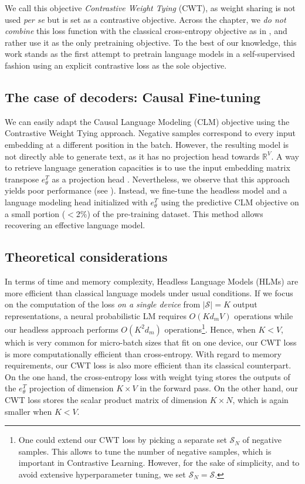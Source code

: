We call this objective \textit{Contrastive Weight Tying} (CWT), as weight sharing is not used \textit{per se} but is set as a contrastive objective. Across the chapter, we \textit{do not combine} this loss function with the classical cross-entropy objective as in \citet{su2022contrastive}, and rather use it as the only pretraining objective. To the best of our knowledge, this work stands as the first attempt to pretrain language models in a self-supervised fashion using an explicit contrastive loss as the sole objective.

\subsection{The case of decoders: Causal Fine-tuning}
\label{sec:causal_fine-tuning}

We can easily adapt the Causal Language Modeling (CLM) objective using the Contrastive Weight Tying approach. Negative samples correspond to every input embedding at a different position in the batch. However, the resulting model is not directly able to generate text, as it has no projection head towards $\mathbb{R}^V$. A way to retrieve language generation capacities is to use the input embedding matrix transpose $e_{\theta}^T$ as a projection head \citep{kumar2018vmf,tokarchuk-niculae-2022-target}. Nevertheless, we observe that this approach yields poor performance (see ). Instead, we fine-tune the headless model and a language modeling head initialized with $e_{\theta}^T$ using the predictive CLM objective on a small portion ($<$2\%) of the pre-training dataset. This method allows recovering an effective language model.

\subsection{Theoretical considerations}
\label{sec:theory}
In terms of time and memory complexity, Headless Language Models (HLMs) are more efficient than classical language models under usual conditions. If we focus on the computation of the loss \textit{on a single device} from $|\mathcal{S}| = K$ output representations, a neural probabilistic LM requires $O(Kd_mV)$ operations while our headless approach performs $O(K^2d_m)$ operations\footnote{One could extend our CWT loss by picking a separate set $\mathcal{S}_N$ of negative samples. This allows to tune the number of negative samples, which is important in Contrastive Learning. However, for the sake of simplicity, and to avoid extensive hyperparameter tuning, we set $\mathcal{S}_N = \mathcal{S}$.}. Hence, when $K < V$, which is very common for micro-batch sizes that fit on one device, our CWT loss is more computationally efficient than cross-entropy. 
%
With regard to memory requirements, our CWT loss is also more efficient than its classical counterpart. On the one hand, the cross-entropy loss with weight tying stores the outputs of the $e_\theta^T$ projection of dimension $K \times V$ in the forward pass. On the other hand, our CWT loss stores the scalar product matrix of dimension $K \times N$, which is again smaller when $K < V$.

